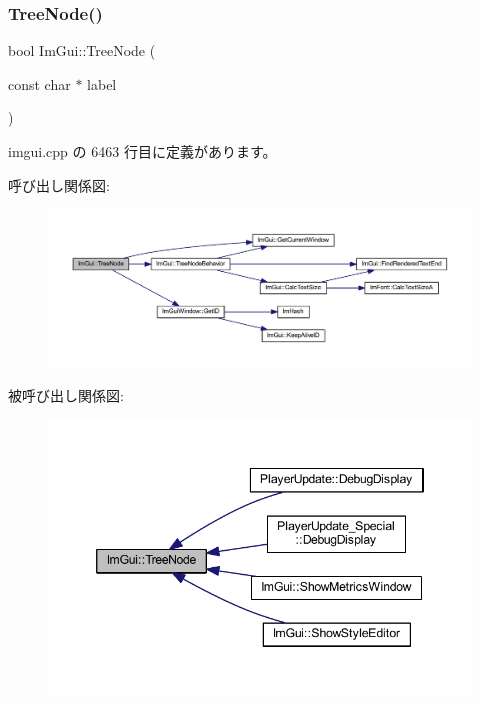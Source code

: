 \subsubsection{\texorpdfstring{Tree\+Node()}{TreeNode()}\hspace{0.1cm}{\footnotesize\ttfamily [1/3]}}
{\footnotesize\ttfamily bool Im\+Gui\+::\+Tree\+Node (\begin{DoxyParamCaption}\item[{const char $\ast$}]{label }\end{DoxyParamCaption})}



 imgui.\+cpp の 6463 行目に定義があります。

呼び出し関係図\+:\nopagebreak
\begin{figure}[H]
\begin{center}
\leavevmode
\includegraphics[width=350pt]{namespace_im_gui_a4dff507ce8bbe0da9556bb50b1e60d7f_cgraph}
\end{center}
\end{figure}
被呼び出し関係図\+:\nopagebreak
\begin{figure}[H]
\begin{center}
\leavevmode
\includegraphics[width=346pt]{namespace_im_gui_a4dff507ce8bbe0da9556bb50b1e60d7f_icgraph}
\end{center}
\end{figure}
\mbox{\label{namespace_im_gui_a6e6e4de20291002430854cbd8cd58843}} 
